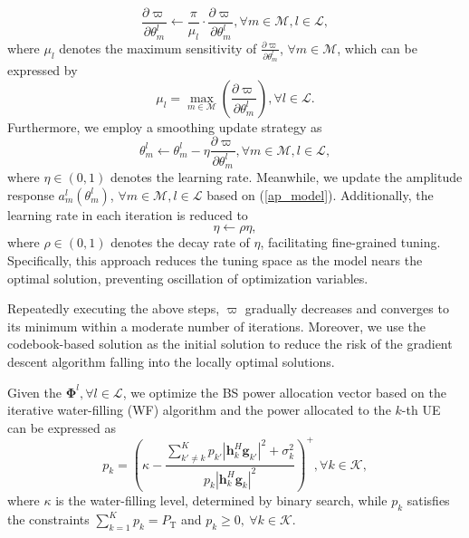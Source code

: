 \documentclass[conference]{IEEEtran}
\theoremstyle{remark}
\begin{document}
\begin{equation}\label{gradient_clc}
\frac{\partial \varpi}{\partial {\theta}_{m}^{l} } \leftarrow \frac{\pi}{ \mu_{l}} \cdot \frac{\partial \varpi}{\partial {\theta}_{m}^{l} }, \forall m \in \mathcal{M}, l \in \mathcal{L},
\end{equation}
where $\mu_{l}$ denotes the maximum sensitivity of $\frac{\partial \varpi}{\partial \theta_{m}^{l}}$, $\forall m \in \mathcal{M}$, which can be expressed by 
\begin{equation}\label{Normalization}
\mu_{l}=\max _{m \in \mathcal{M}}\left(\frac{\partial \varpi}{\partial \theta_{m}^{l}}\right), \forall l \in \mathcal{L}.
\end{equation}
Furthermore, we employ a smoothing update strategy as
\begin{equation}\label{Configuring}
{\theta}_{m}^{l} \leftarrow {\theta}_{m}^{l}-\eta \frac{\partial \varpi}{\partial {\theta}_{m}^{l} }, \forall m \in \mathcal{M}, l \in \mathcal{L},
\end{equation}
where $\eta\in(0,1)$ denotes the learning rate. Meanwhile, we update the amplitude response $a_{m}^{l}( {\theta}_{m}^{l})$, $\forall m\in\mathcal{M},l\in\mathcal{L}$ based on (\ref{ap_model}).
Additionally, the learning rate in each iteration is reduced to
\begin{equation}\label{Update}
\eta \leftarrow \rho \eta ,
\end{equation}
where $\rho\in(0,1)$ denotes the decay rate of $\eta$, facilitating fine-grained tuning. Specifically, 
this approach reduces the tuning space as the model nears the optimal solution, preventing oscillation of optimization variables.

Repeatedly executing the above steps, $\varpi$ gradually decreases and converges to its minimum within a moderate number of iterations. Moreover, we use the codebook-based solution \cite{Group_AN_CB_Mag} as the initial solution to reduce the risk of the gradient descent algorithm falling into the locally optimal solutions.

Given the $\mathbf{\Phi}^{l}, \forall l\in \mathcal{L}$, we optimize the BS power allocation vector based on the iterative water-filling (WF) algorithm \cite{Group_An_SIM_JSAC} and the power allocated to the $k$-th UE can be expressed as
\begin{equation}
 {p_{k}}= \left(\kappa- \frac {\textstyle \sum_{k'\neq k}^{K} {p_{k'}}\left | \mathbf{h}^{H}_{k} {\mathbf{g}_{k'}}\right |^2 +\sigma^2_{k}} {{{p}_{k}}\left | \mathbf{h}^{H}_{k}{\mathbf{g}_{k}} \right |^2 }
 \right)^{+}, \forall k \in \mathcal{K}, 
\end{equation}
where $\kappa$ is the water-filling level, determined by binary search, while ${p_{k}}$ satisfies the constraints ${\textstyle \sum_{k=1}^{K}} {p_{k}}=P_\text{T}$ and ${p_{k}} \ge 0, \ {\forall}{k}\in\mathcal{K}$.
\end{document}
